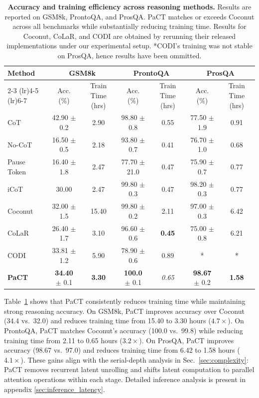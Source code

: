 \begin{table}[t]
\centering
\begin{tabular}{lcccccc}
\toprule
\multirow{2}{*}{Method} 
& \multicolumn{2}{c}{GSM8k} 
& \multicolumn{2}{c}{ProntoQA} 
& \multicolumn{2}{c}{ProsQA} \\
\cmidrule(lr){2-3} 
\cmidrule(lr){4-5} 
\cmidrule(lr){6-7} 
& Acc. (\%) & Train Time (hrs)
& Acc. (\%) & Train Time (hrs)
& Acc. (\%) & Train Time (hrs) \\
\midrule
CoT 
& 42.90 $\pm$ 0.2 & 2.90
& 98.80 $\pm$ 0.8 & 0.55
& 77.50 $\pm$ 1.9 & 0.91 \\
No-CoT 
& 16.50 $\pm$ 0.5 & 2.18
& 93.80 $\pm$ 0.7 & 0.41
& 76.70 $\pm$ 1.0 & 0.68 \\
Pause Token 
& 16.40 $\pm$ 1.8 & 2.47
& 77.70 $\pm$ 21.0 & 0.47
& 75.90 $\pm$ 0.7 & 0.77 \\
iCoT 
& 30.00 & 2.47
& 99.80 $\pm$ 0.3 & 0.47
& 98.20 $\pm$ 0.3 & 0.77 \\
\midrule
Coconut 
& 32.00 $\pm$ 1.5 & 15.40
& 99.80 $\pm$ 0.2 & 2.11
& 97.00 $\pm$ 0.3 & 6.42 \\
CoLaR
& 26.40 $\pm$ 1.7 & 3.10
& 96.60 $\pm$ 0.6 & \textbf{0.45}
& 75.00 $\pm$ 0.8 & 6.21 \\
CODI
& 33.81 $\pm$ 1.2 & 5.90
& 78.90 $\pm$ 0.6 & 0.89
& * & * \\

\textbf{PaCT} 
& \textbf{34.40} $\pm$ 0.1 & \textbf{3.30}
& \textbf{100.0} $\pm$ 0.1 & \textit{0.65}
& \textbf{98.67} $\pm$ 0.2 & \textbf{1.58} \\
\bottomrule
\end{tabular}
\caption{\textbf{Accuracy and training efficiency across reasoning methods.}
Results are reported on GSM8k, ProntoQA, and ProsQA.
PaCT matches or exceeds Coconut across all benchmarks while substantially reducing training time.
Results for Coconut, CoLaR, and CODI are obtained by rerunning their released implementations under our experimental setup. *CODI's training was not stable on ProsQA, hence results have been ommitted.}
\label{tab:main_results}
\vspace{-7mm}
\end{table}

Table~\ref{tab:main_results} shows that PaCT consistently reduces training time while maintaining strong reasoning
accuracy. On GSM8k, PaCT improves accuracy over Coconut (34.4 vs.\ 32.0) and reduces training time from 15.40 to
3.30 hours ($4.7\times$). On ProntoQA, PaCT matches Coconut’s accuracy (100.0 vs.\ 99.8) while reducing training time
from 2.11 to 0.65 hours ($3.2\times$). On ProsQA, PaCT improves accuracy (98.67 vs.\ 97.0) and reduces training time
from 6.42 to 1.58 hours ($4.1\times$). These gains align with the serial-depth analysis in Sec.~\ref{sec:complexity}:
PaCT removes recurrent latent unrolling and shifts latent computation to parallel attention operations within each stage. Detailed inference analysis is present in appendix \ref{sec:inference_latency}.



